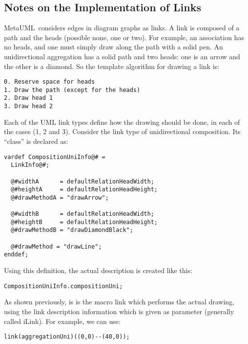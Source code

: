 \documentclass{article}
\newcommand{\code}{\ttfamily}
\newcommand{\metauml}{MetaUML}
\begin{document}
\subsection{Notes on the Implementation of Links}

\metauml\ considers edges in diagram graphs as links. A link is composed of a path and the
heads (possible none, one or two). For example, an association has no heads, and one must simply
draw along the path with a solid pen. An unidirectional aggregation has a solid path and two
heads: one is an arrow and the other is a diamond. So the template algorithm for drawing a link
is:

\begin{verbatim}
0. Reserve space for heads
1. Draw the path (except for the heads)
2. Draw head 1
3. Draw head 2
\end{verbatim}

Each of the UML link types define how the drawing should be done, in each of the
cases (1, 2 and 3). Consider the link type of unidirectional composition.
Its ``class'' is declared as:

\begin{verbatim}
vardef CompositionUniInfo@# =
  LinkInfo@#;

  @#widthA      = defaultRelationHeadWidth;
  @#heightA     = defaultRelationHeadHeight;
  @#drawMethodA = "drawArrow";

  @#widthB      = defaultRelationHeadWidth;
  @#heightB     = defaultRelationHeadHeight;
  @#drawMethodB = "drawDiamondBlack";

  @#drawMethod = "drawLine";
enddef;
\end{verbatim}

Using this definition, the actual description is created like this:

\begin{verbatim}
CompositionUniInfo.compositionUni;
\end{verbatim}

As shown previously, is is the macro {\code link} which
performs the actual drawing, using the link description information
which is given as parameter (generally called {\code iLink}).
For example, we can use:

\begin{verbatim}
link(aggregationUni)((0,0)--(40,0));
\end{verbatim}

\end{document}

